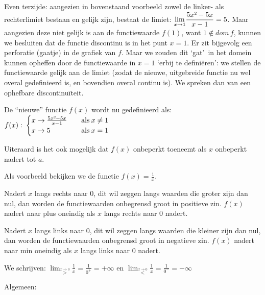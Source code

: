 Even terzijde: aangezien in bovenstaand voorbeeld zowel
de linker- als rechterlimiet bestaan en gelijk zijn, bestaat de limiet:
${\displaystyle \lim_{x\to1}}{\displaystyle \frac{5x\text{\texttwosuperior}-5x}{x-1}}=5$.
Maar aangezien deze niet gelijk is aan de functiewaarde $f(1)$, want
$1\notin dom\,f$, kunnen we besluiten dat de functie discontinu is
in het punt $x=1$. Er zit bijgevolg een perforatie (gaatje) in de
grafiek van $f$. Maar we zouden dit \textquoteleft gat\textquoteright \ in het domein kunnen opheffen
door de functiewaarde in $x=1$ \textquoteleft erbij te defini\"eren\textquoteright: we stellen
de functiewaarde gelijk aan de limiet (zodat de nieuwe, uitgebreide
functie nu wel overal gedefinieerd is, en bovendien overal continu
is). We spreken dan van een ophefbare discontinu\"iteit.

De ``nieuwe'' functie $f(x)$ wordt nu gedefinieerd als:
$f(x):\:\begin{cases}
x\rightarrow\frac{5x\text{\texttwosuperior}-5x}{x-1} & \quad\mathrm{als}\:x\neq1\\
x\rightarrow5 & \quad\mathrm{als}\:x=1
\end{cases}$

Uiteraard is het ook mogelijk dat $f(x)$ onbeperkt toeneemt
als $x$ onbeperkt nadert tot $a$. 

\begin{voorbeeld}
Als voorbeeld bekijken we de functie
$f(x)=\frac{1}{x}$.


\begin{figure}[H]
	\centering
	
\end{figure}

Nadert $x$ langs rechts naar $0$, dit wil zeggen langs
waarden die groter zijn dan nul, dan worden de functiewaarden onbegrensd
groot in positieve zin. $f(x)$ nadert naar plus oneindig als $x$
langs rechts naar $0$ nadert. 

Nadert $x$ langs links naar $0$, dit wil zeggen langs
waarden die kleiner zijn dan nul, dan worden de functiewaarden onbegrensd
groot in negatieve zin. $f(x)$ nadert naar min oneindig als $x$
langs links naar $0$ nadert.


We schrijven: ${\displaystyle \lim_{\overset{x\rightarrow0}{>}}}{\displaystyle \frac{1}{x}}={\displaystyle \frac{1}{0^{+}}}=+\infty$
en ${\displaystyle \lim_{\overset{x\rightarrow0}{<}}}{\displaystyle \frac{1}{x}}={\displaystyle \frac{1}{0^{-}}}=-\infty$

\end{voorbeeld}
Algemeen:

